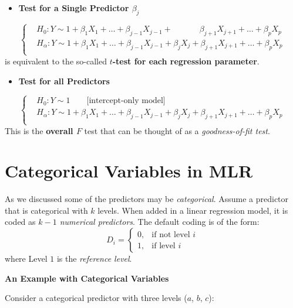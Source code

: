 \documentclass[
]{book}
\providecommand{\tightlist}{%
  \setlength{\itemsep}{0pt}\setlength{\parskip}{0pt}}
\begin{document}
\begin{itemize}
\tightlist
\item
  \textbf{Test for a Single Predictor \(\beta_j\)}
\end{itemize}

\[\begin{cases}
 & H_0: Y \sim  1+  \beta_1 X_1 + \ldots + \beta_{j-1}X_{j-1} + \qquad \quad \; \beta_{j+1} X_{j+1} + \ldots + \beta_p X_p \\
 & H_{\alpha}:  Y \sim  1+  \beta_1 X_1 + \ldots + \beta_{j-1}X_{j-1} +  \beta_{j} X_{j} + \beta_{j+1} X_{j+1} + \ldots + \beta_p X_p \\
 \end{cases} 
 \]
is equivalent to the so-called \textbf{\(t\)-test for each regression parameter}.

\begin{itemize}
\tightlist
\item
  \textbf{Test for all Predictors}
\end{itemize}

\[\begin{cases}
 &H_0: Y \sim  1 \qquad \text{[intercept-only model]} \\
 & H_{\alpha}:  Y \sim  1+  \beta_1 X_1 + \ldots + \beta_{j-1}X_{j-1} +  \beta_{j} X_{j} + \beta_{j+1} X_{j+1} + \ldots + \beta_p X_p \\
 \end{cases} 
 \]
This is the \textbf{overall \(F\)} test that can be thought of as a \emph{goodness-of-fit test}.

\section{Categorical Variables in MLR}\label{categorical-variables-in-mlr}

As we discussed some of the predictors may be \emph{categorical}. Assume a predictor that is categorical with \(k\) levels. When added in a linear regression model, it is coded as \emph{\(k-1\) numerical predictors}. The default coding is of the form:
\[D_i=\left\{\begin{array}{cl}
            0, & \mbox{if not level $i$} \\
            1, & \mbox{if level $i$}
        \end{array}\right .\]
where Level \(1\) is the \emph{reference level}.

\textbf{An Example with Categorical Variables}

Consider a categorical predictor with three levels (\(a\), \(b\), \(c\)):
\end{document}
